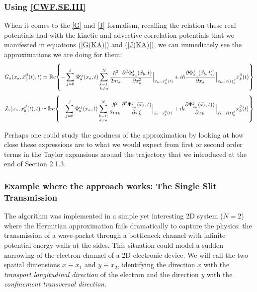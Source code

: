 \documentclass[11pt, a4paper]{article} %
\newcommand{\R}{\mathbb{R}} %
\newcommand{\U}{\mathscr{U}}
\begin{document}
\subsubsection{Using \ref{CWF.SE.III}}
When it comes to the \ref{G} and \ref{J} formalism, recalling the relation these real potentials had with the kinetic and advective correlation potentials that we manifested in equations (\ref{G(KA)}) and (\ref{J(KA)}), we can immediately see the approximations we are doing for them:
$$
G_a(x_a,\vec{x}_b^\beta(t),t)\simeq \R e \qty{ - \sum_{j=0}^J  \U^j_a(x_a,t) \sum_{\substack{k=1; \\ k\neq a}}^{N}  \frac{\hbar^2}{2m_k} \pdv[2]{ \Phi_{x_a}^j(\vec{x}_b,t)}{x_k}\Big\rvert_{\vec{x}_b=\vec{x}_b^\beta(t)} +  i \hbar \pdv{ \Phi_{x_a}^j(\vec{x}_b,t))}{x_k}\Big\rvert_{\vec{x}_b=\vec{x}(t)_b^\beta} \dot{x}_k^\beta(t)}
$$
$$
J_a(x_a,\vec{x}_b^\beta(t),t)\simeq \mathbb{I} m \qty{ - \sum_{j=0}^J  \U^j_a(x_a,t) \sum_{\substack{k=1; \\ k\neq a}}^{N}  \frac{\hbar^2}{2m_k} \pdv[2]{ \Phi_{x_a}^j(\vec{x}_b,t)}{x_k}\Big\rvert_{\vec{x}_b=\vec{x}_b^\beta(t)} +  i \hbar \pdv{ \Phi_{x_a}^j(\vec{x}_b,t))}{x_k}\Big\rvert_{\vec{x}_b=\vec{x}(t)_b^\beta} \dot{x}_k^\beta(t)}
$$

Perhaps one could study the goodness of the approximation by looking at how close these expressions are to what we would expect from first or second order terms in the Taylor expansions around the trajectory that we introduced at the end of Section 2.1.3.


\subsubsection{Example where the approach works: The Single Slit Transmission}
The algorithm was implemented in a simple yet interesting 2D system ($N=2$) where the Hermitian approximation fails dramatically to capture the physics: the transmission of a wave-packet through a bottleneck channel with infinite potential energy walls at the sides. This situation could model a sudden narrowing of the electron channel of a 2D electronic device. We will call the two spatial dimensions $x\equiv x_1$ and $y\equiv x_2$, identifying the direction $x$ with the {\em transport longitudinal direction} of the electron and the direction $y$ with the {\em confinement transversal direction}.

\end{document}
